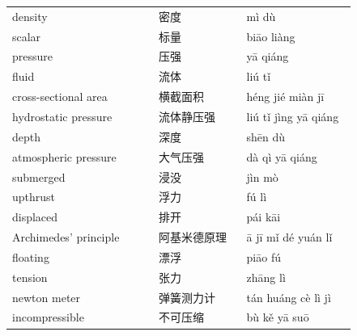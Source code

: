 \documentclass[11pt]{article}
\begin{document}
\begin{longtable}{@{}p{0.40\linewidth}p{0.24\linewidth}p{0.30\linewidth}@{}}
density & 密度 & mì dù \\
scalar & 标量 & biāo liàng \\
pressure & 压强 & yā qiáng \\
fluid & 流体 & liú tǐ \\
cross-sectional area & 横截面积 & héng jié miàn jī \\
hydrostatic pressure & 流体静压强 & liú tǐ jìng yā qiáng \\
depth & 深度 & shēn dù \\
atmospheric pressure & 大气压强 & dà qì yā qiáng \\
submerged & 浸没 & jìn mò \\
upthrust & 浮力 & fú lì \\
displaced & 排开 & pái kāi \\
Archimedes' principle & 阿基米德原理 & ā jī mǐ dé yuán lǐ \\
floating & 漂浮 & piāo fú \\
tension & 张力 & zhāng lì \\
newton meter & 弹簧测力计 & tán huáng cè lì jì \\
incompressible & 不可压缩 & bù kě yā suō \\
\end{longtable}
\end{document}
